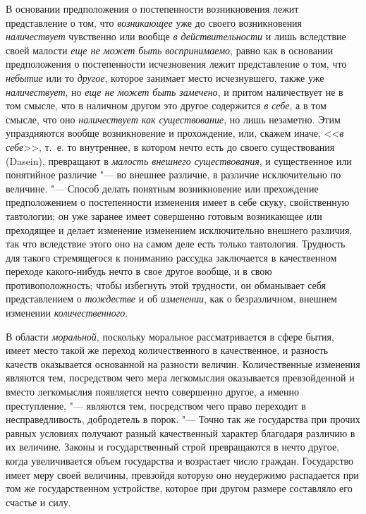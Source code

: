В основании предположения о постепенности возникновения лежит представление
о том, что {\em возникающее} уже до своего
возникновения {\em наличествует} чувственно или вообще
{\em в действительности} и лишь вследствие своей
малости {\em еще не может быть воспринимаемо}, равно
как в основании предположения о постепенности исчезновения лежит
представление о том, что {\em небытие} или то
{\em другое}, которое занимает место исчезнувшего,
также уже {\em наличествует}, но
{\em еще не может быть замечено}, и притом наличествует
не в том смысле, что в наличном другом это другое содержится
{\em в себе}, а в том смысле, что оно
{\em наличествует как существование}, но лишь
незаметно. Этим упраздняются вообще возникновение и прохождение, или,
скажем иначе, <<{\em в себе}>>, т.~е. то внутреннее, в
котором нечто есть до своего существования (Dasein), превращают в
{\em малость внешнего существования}, и существенное
или понятийное различие "--- во внешнее различие, в различие исключительно по
величине. "--- Способ делать понятным возникновение или прехождение
предположением о постепенности изменения имеет в себе скуку, свойственную
тавтологии; он уже заранее имеет совершенно готовым возникающее или
преходящее и делает изменение изменением исключительно внешнего различия,
так что вследствие этого оно на самом деле есть только тавтология.
Трудность для такого стремящегося к пониманию рассудка заключается в
качественном переходе какого-нибудь нечто в свое другое вообще, и в свою
противоположность; чтобы избегнуть этой трудности, он обманывает себя
представлением о {\em тождестве} и об
{\em изменении}, как о безразличном, внешнем изменении
{\em количественного}.

В области {\em моральной}, поскольку моральное
рассматривается в сфере бытия, имеет место такой же переход количественного
в качественное, и разность качеств оказывается основанной на разности
величин. Количественные изменения являются тем, посредством чего мера
легкомыслия оказывается превзойденной и вместо легкомыслия появляется нечто
совершенно другое, а именно преступление, "--- являются тем, посредством чего
право переходит в несправедливость, добродетель в порок. "--- Точно так же
государства при прочих равных условиях получают разный качественный
характер благодаря различию в их величине. Законы и государственный строй
превращаются в нечто другое, когда увеличивается объем государства и
возрастает число граждан. Государство имеет меру своей величины, превзойдя
которую оно неудержимо распадается при том же государственном устройстве,
которое при другом размере составляло его счастье и силу.

